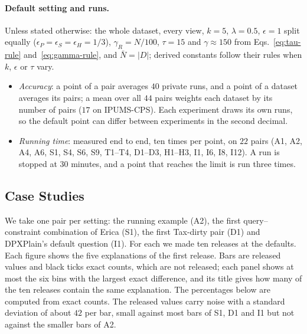 \paragraph{Default setting and runs.}
Unless stated otherwise: the whole dataset, every view, $k=5$, $\lambda=0.5$, $\epsilon=1$ split equally ($\epsilon_P=\epsilon_S=\epsilon_H=1/3$), $\gamma_R=N/100$, $\tau=15$ and $\gamma\approx150$ from Eqs.~\eqref{eq:tau-rule} and~\eqref{eq:gamma-rule}, and $\bar N=|D|$; derived constants follow their rules when $k$, $\epsilon$ or $\tau$ vary.
\begin{itemize}[leftmargin=*,itemsep=1pt,topsep=2pt]
  \item \emph{Accuracy}: a point of a pair averages $40$ private runs, and a point of a dataset averages its pairs; a mean over all $44$ pairs weights each dataset by its number of pairs ($17$ on IPUMS-CPS). Each experiment draws its own runs, so the default point can differ between experiments in the second decimal.
  \item \emph{Running time}: measured end to end, ten times per point, on $22$ pairs (A1, A2, A4, A6, S1, S4, S6, S9, T1--T4, D1--D3, H1--H3, I1, I6, I8, I12). A run is stopped at $30$ minutes, and a point that reaches the limit is run three times.
\end{itemize}

\subsection{Case Studies}
\label{sec:usecase-results}

We take one pair per setting: the running example (A2), the first query--constraint combination of Erica (S1), the first Tax-dirty pair (D1) and DPXPlain's default question (I1).
For each we made ten releases at the defaults.
Each figure shows the five explanations of the first release.
Bars are released values and black ticks exact counts, which are not released; each panel shows at most the six bins with the largest exact difference, and its title gives how many of the ten releases contain the same explanation.
The percentages below are computed from exact counts.
The released values carry noise with a standard deviation of about $42$ per bar, small against most bars of S1, D1 and I1 but not against the smaller bars of A2.

